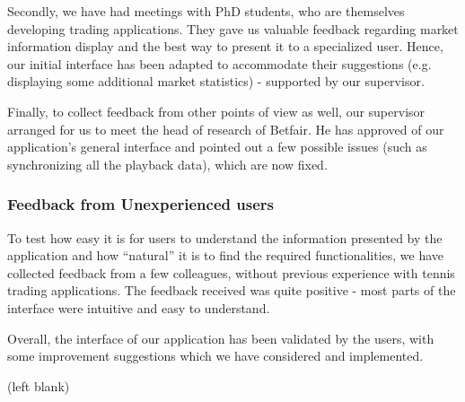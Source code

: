 \documentclass[10pt]{article}
\begin{document}
Secondly, we have had meetings with PhD students, who are themselves developing trading applications. They gave us valuable feedback regarding market information display and the best way to present it to a specialized user. Hence, our initial interface has been adapted to accommodate their suggestions (e.g. displaying some additional market statistics) - supported by our supervisor.

Finally, to collect feedback from other points of view as well, our supervisor arranged for us to meet the head of research of Betfair. He has approved of our application's general interface and pointed out a few possible issues (such as synchronizing all the playback data), which are now fixed.

\subsubsection{Feedback from Unexperienced users}

To test how easy it is for users to understand the information presented by the application and how ``natural'' it is to find the required functionalities, we have collected feedback from a few colleagues, without previous experience with tennis trading applications. The feedback received was quite positive - most parts of the interface were intuitive and easy to understand.

Overall, the interface of our application has been validated by the users, with some improvement suggestions which we have considered and implemented.

\clearpage
(left blank)
\end{document}
